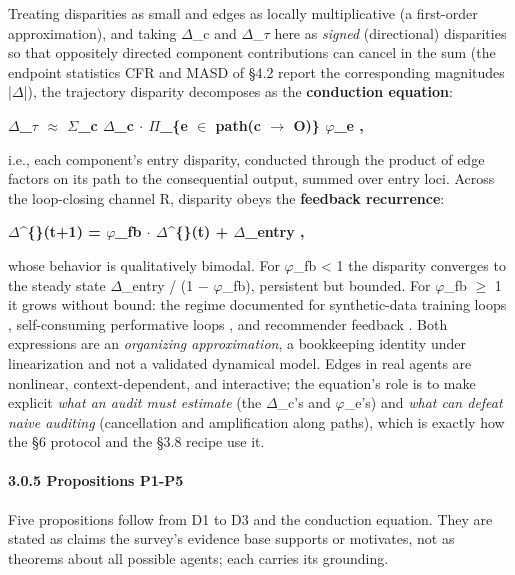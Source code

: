 \documentclass[10pt]{article}
\begin{document}
Treating disparities as small and edges as locally multiplicative (a first-order approximation), and taking $\Delta$\_c and $\Delta$\_$\tau$ here as \emph{signed} (directional) disparities so that oppositely directed component contributions can cancel in the sum (the endpoint statistics CFR and MASD of \S{}4.2 report the corresponding magnitudes |$\Delta$|), the trajectory disparity decomposes as the \textbf{conduction equation}:

\textbf{$\Delta$\_$\tau$ $\approx$ $\Sigma$\_c $\Delta$\_c $\cdot$ $\Pi$\_\{e $\in$ path(c $\rightarrow$ O)\} $\varphi$\_e ,}

i.e., each component's entry disparity, conducted through the product of edge factors on its path to the consequential output, summed over entry loci. Across the loop-closing channel R, disparity obeys the \textbf{feedback recurrence}:

\textbf{$\Delta$\textasciicircum\{\}(t+1) = $\varphi$\_fb $\cdot$ $\Delta$\textasciicircum\{\}(t) + $\Delta$\_entry ,}

whose behavior is qualitatively bimodal. For $\varphi$\_fb < 1 the disparity converges to the steady state $\Delta$\_entry / (1 $-$ $\varphi$\_fb), persistent but bounded. For $\varphi$\_fb $\geq$ 1 it grows without bound: the regime documented for synthetic-data training loops \cite{wyllie2024fairness}, self-consuming performative loops \cite{wang2026observations}, and recommender feedback \cite{mansoury2020feedback}. Both expressions are an \emph{organizing approximation}, a bookkeeping identity under linearization and not a validated dynamical model. Edges in real agents are nonlinear, context-dependent, and interactive; the equation's role is to make explicit \emph{what an audit must estimate} (the $\Delta$\_c's and $\varphi$\_e's) and \emph{what can defeat naive auditing} (cancellation and amplification along paths), which is exactly how the \S{}6 protocol and the \S{}3.8 recipe use it.

\paragraph*{3.0.5 Propositions P1-P5}

Five propositions follow from D1 to D3 and the conduction equation. They are stated as claims the survey's evidence base supports or motivates, not as theorems about all possible agents; each carries its grounding.
\end{document}
